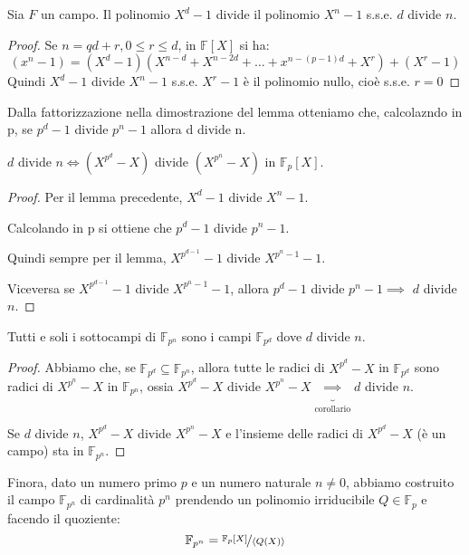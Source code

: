 \documentclass[../main.tex]{subfiles}
\begin{document}
\begin{lemma}
    Sia $F$ un campo. Il polinomio $X^d - 1$ divide il polinomio $X^n - 1$ s.s.e. $d$ divide $n$.
\end{lemma}

\begin{proof}
    Se $n = qd + r, 0 \leq r \leq d$, in $\mathbb{F}[X]$ si ha:
    \begin{equation*}
        (x^n - 1) = (X^d - 1)(X^{n-d} + X^{n-2d} + \ldots + x^{n-(p-1)d} + X^r) + (X^r -1)
    \end{equation*}
    Quindi $X^d - 1$ divide $X^n - 1$ s.s.e. $X^r - 1$ è il polinomio nullo, cioè s.s.e. $r = 0$
\end{proof}

Dalla fattorizzazione nella dimostrazione del lemma otteniamo che, calcolazndo in p, se $p^d - 1$ divide $p^n - 1$ allora d divide n.

\begin{corollary}
    $d$ divide $n \iff (X^{p^d} - X)$ divide $(X^{p^n} - X)$ in $\mathbb{F}_p[X]$.
\end{corollary}
\begin{proof}
    Per il lemma precedente, $X^d - 1$ divide $X^n - 1$.

    Calcolando in p si ottiene che $p^d - 1$ divide $p^n - 1$.

    Quindi sempre per il lemma, $X^{p^{d - 1}} - 1$ divide $X^{p^n - 1} - 1$.

    Viceversa se $X^{p^{d - 1}} - 1$ divide $X^{p^n -1 } - 1$, allora $p^d - 1$ divide $p^n - 1 \implies$ $d$ divide $n$.
\end{proof}

\begin{proposition}
    Tutti e soli i sottocampi di $\mathbb{F}_{p^n}$ sono i campi $\mathbb{F}_{p^d}$ dove $d$ divide $n$.
\end{proposition}

\begin{proof}
    Abbiamo che, se $\mathbb{F}_{p^d} \subseteq \mathbb{F}_{p^n}$, allora tutte le radici di $X^{p^d} - X$ in $\mathbb{F}_{p^d}$ sono radici di $X^{p^n} - X$ in $\mathbb{F}_{p^n}$, ossia $X^{p^d} - X$ divide $X^{p^n} - X \underbrace{\implies}_{\text{corollario}} d$ divide $n$.

    Se $d$ divide $n$, $X^{p^d} - X $ divide $X^{p^n} - X$ e l'insieme delle radici di $X^{p^d} - X$ (è un campo) sta in $\mathbb{F}_{p^n}$.
\end{proof}

Finora, dato un numero primo $p$ e un numero naturale $n \neq 0$, abbiamo costruito il campo $\mathbb{F}_{p^n}$ di cardinalità $p^n$ prendendo un polinomio irriducibile $Q \in \mathbb{F}_p$ e facendo il quoziente:
\begin{equation*}
    \mathbb{F}_{p^n} = \nicefrac{\mathbb{F}_p[X]}{\langle Q(X)\rangle}
\end{equation*}
\end{document}
